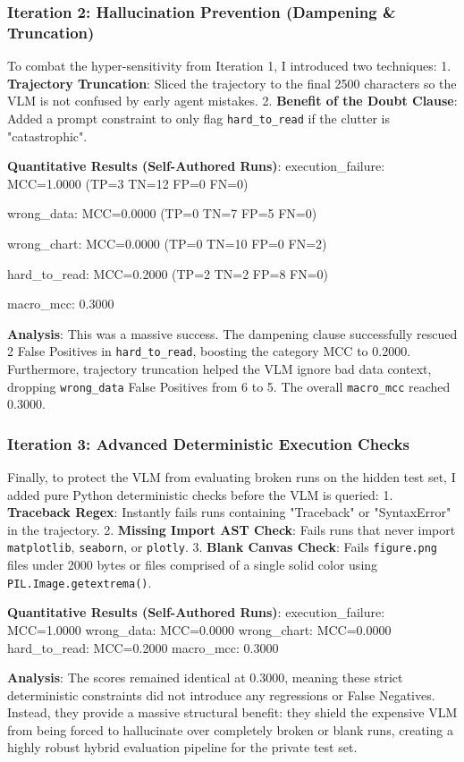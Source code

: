 \documentclass[11pt]{article}
\begin{document}
\subsubsection*{Iteration 2: Hallucination Prevention (Dampening \& Truncation)}
To combat the hyper-sensitivity from Iteration 1, I introduced two techniques:
1. \textbf{Trajectory Truncation}: Sliced the trajectory to the final 2500 characters so the VLM is not confused by early agent mistakes.
2. \textbf{Benefit of the Doubt Clause}: Added a prompt constraint to only flag \texttt{hard\_to\_read} if the clutter is "catastrophic".

\textbf{Quantitative Results (Self-Authored Runs)}:
execution\_failure: MCC=1.0000 (TP=3 TN=12 FP=0 FN=0)

wrong\_data: MCC=0.0000 (TP=0 TN=7 FP=5 FN=0)

wrong\_chart: MCC=0.0000 (TP=0 TN=10 FP=0 FN=2)

hard\_to\_read: MCC=0.2000 (TP=2 TN=2 FP=8 FN=0)

macro\_mcc: 0.3000

\textbf{Analysis}: This was a massive success. The dampening clause successfully rescued 2 False Positives in \texttt{hard\_to\_read}, boosting the category MCC to 0.2000. Furthermore, trajectory truncation helped the VLM ignore bad data context, dropping \texttt{wrong\_data} False Positives from 6 to 5. The overall \texttt{macro\_mcc} reached 0.3000.

\subsubsection*{Iteration 3: Advanced Deterministic Execution Checks}
Finally, to protect the VLM from evaluating broken runs on the hidden test set, I added pure Python deterministic checks before the VLM is queried:
1. \textbf{Traceback Regex}: Instantly fails runs containing "Traceback" or "SyntaxError" in the trajectory.
2. \textbf{Missing Import AST Check}: Fails runs that never import \texttt{matplotlib}, \texttt{seaborn}, or \texttt{plotly}.
3. \textbf{Blank Canvas Check}: Fails \texttt{figure.png} files under 2000 bytes or files comprised of a single solid color using \texttt{PIL.Image.getextrema()}.

\textbf{Quantitative Results (Self-Authored Runs)}:
execution\_failure: MCC=1.0000
wrong\_data: MCC=0.0000
wrong\_chart: MCC=0.0000
hard\_to\_read: MCC=0.2000
macro\_mcc: 0.3000

\textbf{Analysis}: The scores remained identical at 0.3000, meaning these strict deterministic constraints did not introduce any regressions or False Negatives. Instead, they provide a massive structural benefit: they shield the expensive VLM from being forced to hallucinate over completely broken or blank runs, creating a highly robust hybrid evaluation pipeline for the private test set.
\end{document}

